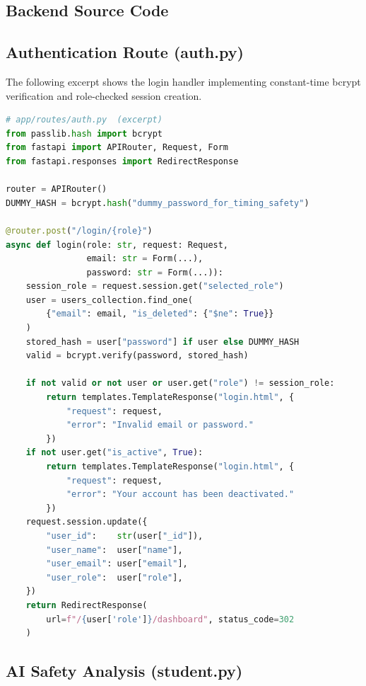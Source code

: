 \documentclass{sgcproject}
\begin{document}
\begin{appendices}

\chapter{Backend Source Code}

\section{Authentication Route (auth.py)}

The following excerpt shows the login handler implementing constant-time bcrypt verification and role-checked session creation.

\begin{lstlisting}[language=Python]
# app/routes/auth.py  (excerpt)
from passlib.hash import bcrypt
from fastapi import APIRouter, Request, Form
from fastapi.responses import RedirectResponse

router = APIRouter()
DUMMY_HASH = bcrypt.hash("dummy_password_for_timing_safety")

@router.post("/login/{role}")
async def login(role: str, request: Request,
                email: str = Form(...),
                password: str = Form(...)):
    session_role = request.session.get("selected_role")
    user = users_collection.find_one(
        {"email": email, "is_deleted": {"$ne": True}}
    )
    stored_hash = user["password"] if user else DUMMY_HASH
    valid = bcrypt.verify(password, stored_hash)

    if not valid or not user or user.get("role") != session_role:
        return templates.TemplateResponse("login.html", {
            "request": request,
            "error": "Invalid email or password."
        })
    if not user.get("is_active", True):
        return templates.TemplateResponse("login.html", {
            "request": request,
            "error": "Your account has been deactivated."
        })
    request.session.update({
        "user_id":    str(user["_id"]),
        "user_name":  user["name"],
        "user_email": user["email"],
        "user_role":  user["role"],
    })
    return RedirectResponse(
        url=f"/{user['role']}/dashboard", status_code=302
    )
\end{lstlisting}

\section{AI Safety Analysis (student.py)}


\end{appendices}
\end{document}

